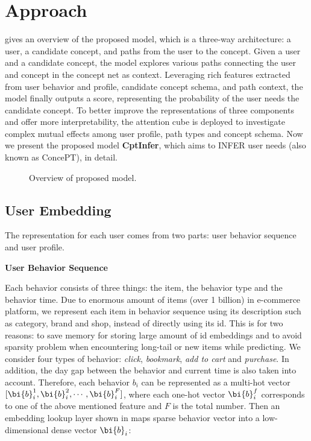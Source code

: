 

\section{Approach}
\label{sec:model}
 gives an overview of the proposed model,
which is a three-way architecture: a user, a candidate concept, and paths from the user to the concept.
Given a user and a candidate concept, 
the model explores various paths connecting the user and concept in the concept net as context.
Leveraging rich features extracted from user behavior and profile, 
candidate concept schema, and path context, 
the model finally outputs a score, representing the probability of the user needs the candidate concept. 
To better improve the representations of three components and offer more interpretability, 
the attention cube is deployed to investigate complex mutual effects 
among user profile, path types and concept schema.
Now we present the proposed model \textbf{CptInfer}, which aims to INFER user needs (also known as ConcePT), in detail.

\begin{figure*}[th]
	\centering
	\caption{Overview of proposed model.}
	\label{fig:model}
\end{figure*}

\subsection{User Embedding}

The representation for each user comes from two parts: user behavior sequence and user profile.

\noindent
\textbf{User Behavior Sequence}

\noindent
Each behavior consists of three things: the item, the behavior type and the behavior time.
Due to enormous amount of items (over 1 billion) in e-commerce platform, 
we represent each item in behavior sequence 
using its description such as category, brand and shop, instead of directly using its id.
This is for two reasons: to save memory for storing large amount of id embeddings and to avoid sparsity problem when encountering long-tail or new items while predicting.
We consider four types of behavior: \textit{click}, \textit{bookmark}, \textit{add to cart} and \textit{purchase}.
In addition, the day gap between the behavior and current time is also taken into account. 
Therefore, each behavior $b_i$ can be represented as a multi-hot vector 
$[\bi{b}_{i}^{1}, \bi{b}_{i}^{2}, \cdots, \bi{b}_{i}^{F}]$,
where each one-hot vector $\bi{b}_{i}^{f}$ corresponds to one of the above mentioned feature and $F$ is the total number.
Then an embedding lookup layer shown in  maps
sparse behavior vector into a low-dimensional dense vector  $\bi{b}_i$:

